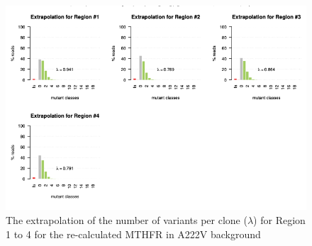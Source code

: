 \documentclass{article}
\begin{document}
\begin{figure}[H]
    \centering
    \includegraphics[width =.8\textwidth]{Figures/MTHFR/extrapolation_nsNew.png}
    \caption{The extrapolation of the number of variants per clone ($\lambda$) for Region 1 to 4 for the re-calculated MTHFR in A222V background}
    \label{fig: extrapolation for all region}
\end{figure}
\end{document}

